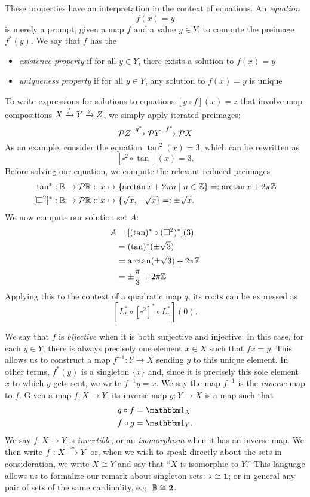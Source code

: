 These properties have an interpretation in the context of equations. An \emph{equation} \[f(x)=y\] is merely a prompt, given a map $f$ and a value $y\in Y$, to compute the preimage $f^*(y)$. We say that $f$ has the

\begin{itemize}
    \item \emph{existence property} if for all $y\in Y$, there exists a solution to $f(x)=y$
    \item \emph{uniqueness property} if for all $y\in Y$, any solution to $f(x)=y$ is unique
    \end{itemize}
To write expressions for solutions to equations $[g\circ f](x) = z$ that involve map compositions $X\xrightarrow{f}Y\xrightarrow{g}Z$, we simply apply iterated preimages:
\[\mathcal{P}Z\xrightarrow{g^*}\mathcal{P}Y\xrightarrow{f^*}\mathcal{P}X\]
As an example, consider the equation $\tan^2(x)=3$, which can be rewritten as
\[[\square^2\circ\tan](x)=3.\] Before solving our equation, we compute the relevant reduced preimages
\begin{align*}
    \tan^*:\mathbb R\to\mathcal{P}\mathbb R &::x\mapsto \{\arctan x+2\pi n\mid n\in\mathbb Z\}=:\arctan{x}+2\pi\mathbb Z \\
    [\square^2]^* :\mathbb R\to\mathcal{P}\mathbb R &::x\mapsto\{\sqrt{x},-\sqrt{x}\}=:\pm\sqrt{x}.
\end{align*}
We now compute our solution set $A$:
\begin{align*}
    A&=[(\tan)^*\circ(\square^2)^*] (3)\\&=(\tan)^*(\pm\sqrt{3})\\&=\arctan(\pm\sqrt{3})+2\pi\mathbb Z \\
    &=\pm\frac{\pi}{3}+2\pi\mathbb Z
\end{align*}
Applying this to the context of a quadratic map $q$, its roots can be expressed as
\[[L^*_h \circ [\square^2]^* \circ L^*_v](0).\]

We say that $f$ is \emph{bijective} when it is both surjective and injective. In this case, for each $y\in Y$, there is always precisely one element $x\in X$ such that $fx=y$. This allows us to construct a map $f^{-1}:Y\to X$ sending $y$ to this unique element. In other terms, $f^*(y)$ is a singleton $\{x\}$ and, since it is precisely this sole element $x$ to which $y$ gets sent, we write $f^{-1}y=x$. We say the map $f^{-1}$ is the \emph{inverse} map to $f$. Given a map $f:X\to Y$, its inverse map $g:Y\to X$ is a map such that
\begin{align*}
     g\circ f &= \Id{X} \\
     f\circ g &= \Id{Y}.
\end{align*}
We say $f:X\to Y$ is \emph{invertible}, or an \emph{isomorphism} when it has an inverse map. We then write $f:X\xrightarrow{\cong} Y$ or, when we wish to speak directly about the sets in consideration, we write $X\cong Y$ and say that ``$X$ is isomorphic to $Y$.'' This language allows us to formalize our remark about singleton sets: $\star\cong\mathbf{1}$; or in general any pair of sets of the same cardinality, e.g. $\mathbb B\cong\mathbf{2}$.


